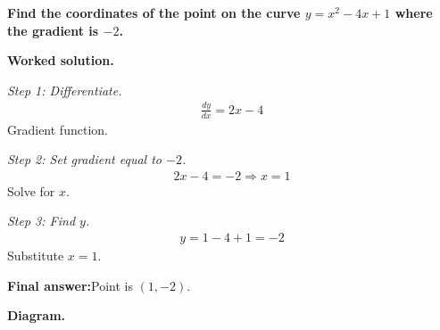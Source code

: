 \documentclass[11pt]{article}
\newcommand{\question}[1]{\par\medskip\noindent\textbf{#1}\par}
\begin{document}
\question{Find the coordinates of the point on the curve \( y = x^2 - 4x + 1 \) where the gradient is \( -2 \).}

\textbf{Worked solution.}

\textit{Step 1: Differentiate.}
\[\begin{gathered}
\frac{dy}{dx} = 2x - 4
\end{gathered}\]
Gradient function.

\textit{Step 2: Set gradient equal to \( -2 \).}
\[\begin{gathered}
2x - 4 = -2 \Rightarrow x = 1
\end{gathered}\]
Solve for \( x \).

\textit{Step 3: Find \( y \).}
\[\begin{gathered}
y = 1 - 4 + 1 = -2
\end{gathered}\]
Substitute \( x = 1 \).

\begin{answerbox}
\textbf{Final answer:}\quad Point is \(\displaystyle  (1, -2) \).
\end{answerbox}
\textbf{Diagram.}
\end{document}
